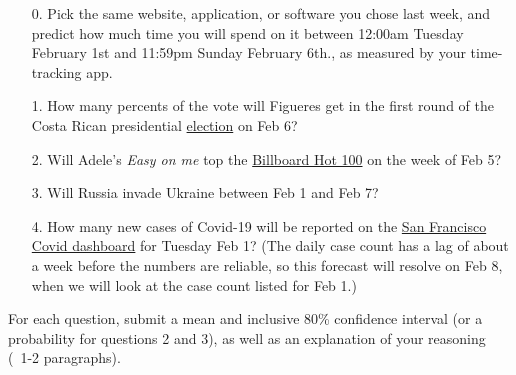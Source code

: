 \documentclass[11pt]{article}
\begin{document}
\begin{enumerate}
	\item[0.] Pick the same website, application, or software you chose last week, and predict how much time you will spend on it between 12:00am Tuesday February 1st and 11:59pm Sunday February 6th., as measured by your time-tracking app.
	
	\item[1.] How many percents of the vote will Figueres get in the first round of the Costa Rican presidential \href{https://en.wikipedia.org/wiki/2022_Costa_Rican_general_election}{election} on Feb 6?
	
	\item[2.] Will Adele's \textit{Easy on me} top the \href{https://www.billboard.com/charts/hot-100/}{Billboard Hot 100} on the week of Feb 5?
 
	\item[3.] Will Russia invade Ukraine between Feb 1 and Feb 7?
	
	\item[4.] How many new cases of Covid-19 will be reported on the \href{https://sf.gov/data/covid-19-cases-and-deaths}{San Francisco Covid dashboard} for Tuesday Feb 1? (The daily case count has a lag of about a week before the numbers are reliable, so this forecast will resolve on Feb 8, when we will look at the case count listed for Feb 1.) 
	
	
\end{enumerate}

For each question, submit a mean and inclusive 80\% confidence interval (or a probability for questions 2 and 3), as well as an explanation of your reasoning (~1-2 paragraphs).
\end{document}
